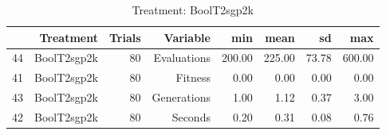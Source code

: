 \begin{table}[ht]
\centering
\begin{tabular}{rrrrrrrr}
  \hline
 & Treatment & Trials & Variable & min & mean & sd & max \\ 
  \hline
44 & BoolT2sgp2k &  80 & Evaluations & 200.00 & 225.00 & 73.78 & 600.00 \\ 
  41 & BoolT2sgp2k &  80 & Fitness & 0.00 & 0.00 & 0.00 & 0.00 \\ 
  43 & BoolT2sgp2k &  80 & Generations & 1.00 & 1.12 & 0.37 & 3.00 \\ 
  42 & BoolT2sgp2k &  80 & Seconds & 0.20 & 0.31 & 0.08 & 0.76 \\ 
   \hline
\end{tabular}
\caption{Treatment: BoolT2sgp2k} 
\end{table}
